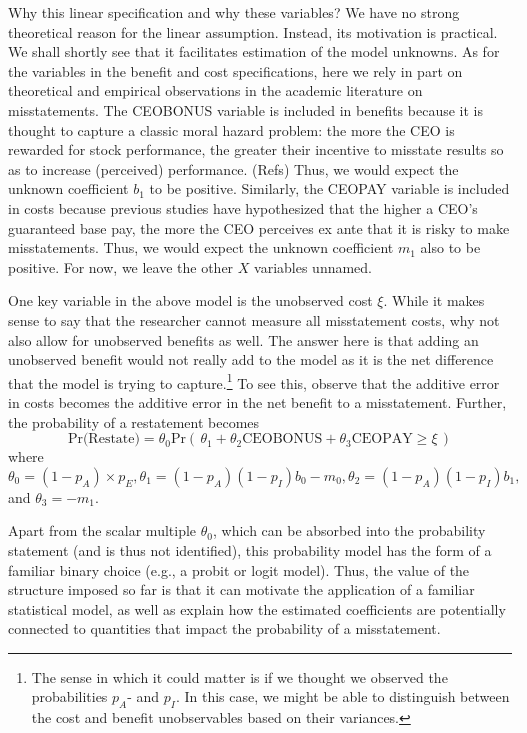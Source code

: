 Why this linear specification and why these variables? We have no strong theoretical
reason for the linear assumption. Instead, its motivation is practical. We shall shortly
see that it facilitates estimation of the model unknowns. As for the variables in the
benefit and cost specifications, here we rely in part on theoretical and empirical
observations in the academic literature on misstatements. The CEOBONUS variable 
is included in benefits because it is thought to capture a classic moral hazard
problem: the more the CEO is rewarded for stock performance, the
greater their incentive to misstate results so as to increase (perceived) 
performance. (Refs) Thus, we would expect the unknown coefficient $b_1$
to be positive. Similarly, the CEOPAY variable is included in costs because 
previous studies have hypothesized that the higher a CEO's guaranteed 
base pay, the more the CEO perceives ex ante that it is risky to make
misstatements.  Thus, we would expect the unknown coefficient $m_1$
also to be positive. For now, we leave the other $X$ variables unnamed.

One key variable in the above model is the unobserved cost $\xi$. While 
it makes sense to say that the researcher cannot measure all misstatement
costs, why not also allow for unobserved benefits as well. The answer here is
that adding an unobserved benefit would not really add to the model as it
is the net difference that the model is trying to capture.\footnote{The sense
in which it could matter is if we thought we observed the probabilities
$p_A$- and $p_I$. In this case, we might be able to distinguish between
the cost and benefit unobservables based on their variances.} To see this,
observe that the additive error in costs becomes the additive error in 
the net benefit to a misstatement. Further, the probability of a restatement
becomes
\begin{equation}\label{restate1}
\mbox{Pr(Restate)} = \theta_0 \mbox{Pr}\left(\, \theta_1 + \theta_2 \mbox{CEOBONUS}
+ \theta_3 \mbox{CEOPAY}  \ge \xi \,\right)
\end{equation}
where $\theta_0=(1-p_A) \times p_{E}, \theta_1 = (1 - p_A)(1 - p_I) b_0 - m_0, 
\theta_2 = (1 - p_A)(1 - p_I) b_1,$ and $\theta_3 = - m_1.$ 

Apart from the scalar multiple $\theta_0$, which can be absorbed into the probability
statement (and is thus not identified), this probability model has the form of 
a familiar binary choice (e.g., a probit or logit model). Thus, the value of the structure
imposed so far is that it can motivate the application of a familiar statistical model, as 
well as explain how the estimated coefficients are potentially connected to quantities
that impact the probability of a misstatement.

